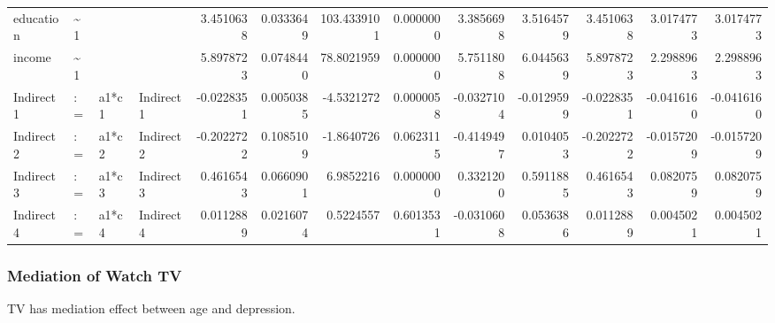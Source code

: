 \documentclass[
]{article}
\begin{document}
\begin{table}[!h]
\begin{tabular}[t]{llllrrrrrrrrr}
\addlinespace
education & \textasciitilde{}1 &  &  & 3.4510638 & 0.0333649 & 103.4339101 & 0.0000000 & 3.3856698 & 3.5164579 & 3.4510638 & 3.0174773 & 3.0174773\\
income & \textasciitilde{}1 &  &  & 5.8978723 & 0.0748440 & 78.8021959 & 0.0000000 & 5.7511808 & 6.0445639 & 5.8978723 & 2.2988963 & 2.2988963\\
Indirect1 & := & a1*c1 & Indirect1 & -0.0228351 & 0.0050385 & -4.5321272 & 0.0000058 & -0.0327104 & -0.0129599 & -0.0228351 & -0.0416160 & -0.0416160\\
Indirect2 & := & a1*c2 & Indirect2 & -0.2022722 & 0.1085109 & -1.8640726 & 0.0623115 & -0.4149497 & 0.0104053 & -0.2022722 & -0.0157209 & -0.0157209\\
Indirect3 & := & a1*c3 & Indirect3 & 0.4616543 & 0.0660901 & 6.9852216 & 0.0000000 & 0.3321200 & 0.5911885 & 0.4616543 & 0.0820759 & 0.0820759\\
\addlinespace
Indirect4 & := & a1*c4 & Indirect4 & 0.0112889 & 0.0216074 & 0.5224557 & 0.6013531 & -0.0310608 & 0.0536386 & 0.0112889 & 0.0045021 & 0.0045021\\
\bottomrule
\end{tabular}
\end{table}

\newpage

\hypertarget{mediation-of-watch-tv}{%
\subsubsection{Mediation of Watch TV}\label{mediation-of-watch-tv}}

TV has mediation effect between age and depression.
\end{document}
